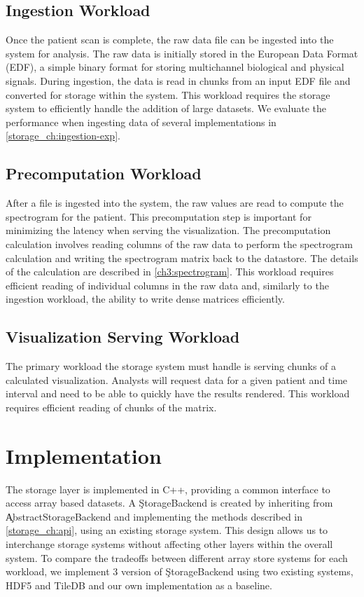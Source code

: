 \subsection{Ingestion Workload}

Once the patient scan is complete, the raw data file can be ingested into the
system for analysis. The raw data is initially stored in the European Data
Format (EDF)\cite{edf}, a simple binary format for storing multichannel
biological and physical signals. During ingestion, the data is read in chunks
from an input EDF file and converted for storage within the system. This
workload requires the storage system to efficiently handle the addition of
large datasets. We evaluate the performance when ingesting data of several
implementations in \ref{storage_ch:ingestion-exp}.


\subsection{Precomputation Workload}

After a file is ingested into the system, the raw values are read to compute
the spectrogram for the patient. This precomputation step is important for
minimizing the latency when serving the visualization. The precomputation
calculation involves reading columns of the raw data to perform the spectrogram
calculation and writing the spectrogram matrix back to the datastore. The
details of the calculation are described in \ref{ch3:spectrogram}. This
workload requires efficient reading of individual columns in the raw data and,
similarly to the ingestion workload, the ability to write dense matrices
efficiently.

\subsection{Visualization Serving Workload}

The primary workload the storage system must handle is serving chunks of a
calculated visualization. Analysts will request data for a given patient and
time interval and need to be able to quickly have the results rendered. This
workload requires efficient reading of chunks of the matrix.

\section{Implementation}

The storage layer is implemented in C++, providing a common interface to access
array based datasets. A \c{StorageBackend} is created by inheriting from
\c{AbstractStorageBackend} and implementing the methods described in
\ref{storage_ch:api}, using an existing storage system. This design allows us
to interchange storage systems without affecting other layers within the
overall system. To compare the tradeoffs between different array store systems
for each workload, we implement 3 version of \c{StorageBackend} using two
existing systems, HDF5 \cite{hdf5} and TileDB \cite{tiledb} and our own
implementation as a baseline.

